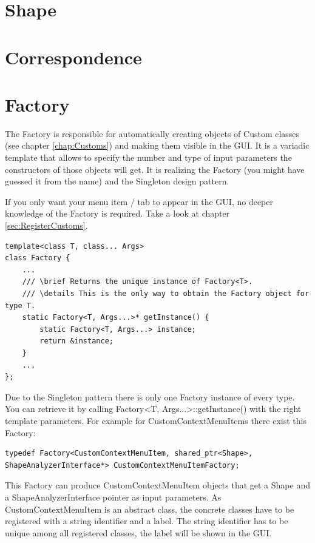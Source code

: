 \section{Shape}
\label{sec:Shape}

\section{Correspondence}
\label{sec:Correspondence}

\section{Factory}
\label{sec:Factory}

The Factory is responsible for automatically creating objects of Custom classes (see chapter \ref{chap:Customs}) and making them visible in the GUI. It is a variadic template that allows to specify the number and type of input parameters the constructors of those objects will get. It is realizing the Factory (you might have guessed it from the name) and the Singleton design pattern. 

\begin{mdframed}
If you only want your menu item / tab to appear in the GUI, no deeper knowledge of the Factory is required. Take a look at chapter \ref{sec:RegisterCustoms}. 
\end{mdframed}

\begin{lstlisting}[style=lstStyleCpp, caption={Factory.h}]
template<class T, class... Args>
class Factory {
    ...
    /// \brief Returns the unique instance of Factory<T>.
    /// \details This is the only way to obtain the Factory object for type T.
    static Factory<T, Args...>* getInstance() {
        static Factory<T, Args...> instance;
        return &instance;
    }
    ...
};
\end{lstlisting}

Due to the Singleton pattern there is only one Factory instance of every type. You can retrieve it by calling Factory<T, Args...>::getInstance() with the right template parameters. For example for CustomContextMenuItems there exist this Factory: 

\begin{lstlisting}[style=lstStyleCpp, numbers=none]
typedef Factory<CustomContextMenuItem, shared_ptr<Shape>, ShapeAnalyzerInterface*> CustomContextMenuItemFactory;
\end{lstlisting}

This Factory can produce CustomContextMenuItem objects that get a Shape and a ShapeAnalyzerInterface pointer as input parameters. As CustomContextMenuItem is an abstract class, the concrete classes have to be registered with a string identifier and a label. The string identifier has to be unique among all registered classes, the label will be shown in the GUI. 

